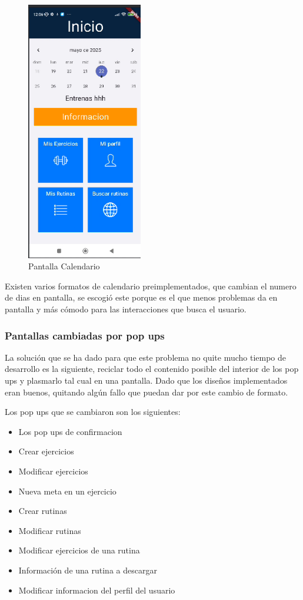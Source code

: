 \begin{figure}[h!]
    \centering
    \includegraphics[width=0.45\textwidth]{fotos/PantallaCalendario.png}
    \caption{Pantalla Calendario}
    \label{fig:Pantalla Calendario}
\end{figure}

Existen varios formatos de calendario preimplementados, que cambian el numero de dias en pantalla, se escogió este porque es el que menos problemas da en pantalla y más cómodo para las interacciones que busca el usuario.

\subsubsection{Pantallas cambiadas por pop ups}

La solución que se ha dado para que este problema no quite mucho tiempo de desarrollo es la siguiente, reciclar todo el contenido posible del interior de los pop ups y plasmarlo tal cual en una pantalla. Dado que los diseños implementados eran buenos, quitando algún fallo que puedan dar por este cambio de formato.

Los pop ups que se cambiaron son los siguientes:

\begin{itemize}
	\item Los pop ups de confirmacion
	\item Crear ejercicios
	\item Modificar ejercicios
	\item Nueva meta en un ejercicio
	\item Crear rutinas
	\item Modificar rutinas
	\item Modificar ejercicios de una rutina
	\item Información de una rutina a descargar
	\item Modificar informacion del perfil del usuario
\end{itemize}

